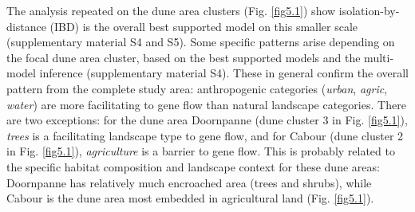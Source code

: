 \documentclass[10pt, twoside]{book} %
\begin{document}
	The analysis repeated on the dune area clusters (Fig. \ref{fig5.1}) show isolation-by-distance (IBD) is the overall best supported model on this smaller scale (supplementary material S4 and S5). Some specific patterns arise depending on the focal dune area cluster, based on the best supported models and the multi-model inference (supplementary material S4). These in general confirm the overall pattern from the complete study area: anthropogenic categories (\textit{urban}, \textit{agric}, \textit{water}) are more facilitating to gene flow than natural landscape categories. There are two exceptions: for the dune area Doornpanne (dune cluster 3 in Fig. \ref{fig5.1}), \textit{trees} is a facilitating landscape type to gene flow, and for Cabour (dune cluster 2 in Fig. \ref{fig5.1}), \textit{agriculture} is a barrier to gene flow. This is probably related to the specific habitat composition and landscape context for these dune areas: Doornpanne has relatively much encroached area (trees and shrubs), while Cabour is the dune area most embedded in agricultural land (Fig. \ref{fig5.1}).\\
	
\end{document}
